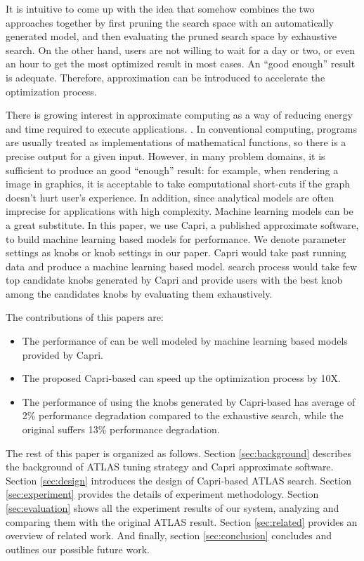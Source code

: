 It is intuitive to come up with the idea that somehow combines the two
approaches together by first pruning the search space with an automatically
generated model, and then evaluating the pruned search space by exhaustive
search. On the other hand, users are not willing
to wait for a day or two, or even an hour to get the most optimized result in
most cases. An ``good enough'' result is adequate. Therefore, approximation can
be introduced to accelerate the optimization process.

There is growing interest in approximate computing as a way of reducing energy
and time required to execute applications. \cite{ansel2011language,
baek2010green, sidiroglou2011managing, swaminathan2015case}. In conventional
computing, programs are usually treated as implementations of mathematical
functions, so there is a precise output for a given input.
However, in many problem domains, it is sufficient to produce an good ``enough''
result: for example, when rendering a image in graphics, it is
acceptable to take computational short-cuts if the graph doesn't hurt user's
experience. In addition, since analytical models are often imprecise for
applications with high complexity. Machine learning models can be a great
substitute. In this paper, we use Capri\cite{sui2016proactive}, a published
approximate software, to build machine learning based models for \gem
performance. We denote parameter settings as knobs or knob settings in
our paper. Capri would take past \atl running data and produce a machine
learning based model. \atl search process would take few top candidate knobs
generated by Capri and provide users with the best knob among the candidates
knobs by evaluating them exhaustively.

The contributions of this papers are:
\begin{itemize}
\item The performance of \gem can be well modeled by machine learning based
models provided by Capri.
\item The proposed Capri-based \atl can speed up the optimization process by 10X.
\item The performance of \gem using the knobs generated by Capri-based \atl
has average of 2\% performance degradation compared to the exhaustive search,
while the original \atl suffers 13\% performance degradation.
\end{itemize}

\par
The rest of this paper is organized as follows. Section \ref{sec:background}
describes the background of ATLAS tuning strategy and Capri approximate
software. Section \ref{sec:design} introduces the design of Capri-based
ATLAS search.
Section \ref{sec:experiment} provides the details of experiment methodology.
Section \ref{sec:evaluation} shows all the experiment results of our system,
analyzing and comparing them with the original ATLAS result.
Section \ref{sec:related} provides an overview of related work.
And finally, section \ref{sec:conclusion} concludes and outlines our possible
future work.

